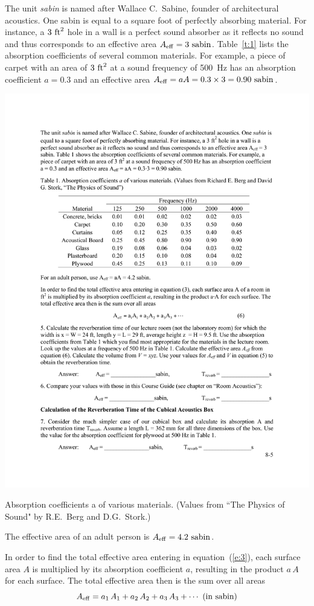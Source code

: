\documentclass[11pt]{NSF}
\def\be{\begin{equation}}
\def\ee{\end{equation}}
\begin{document}
The unit {\em sabin} is named after Wallace C.~Sabine, founder of
architectural acoustics. One sabin is equal to a square foot of
perfectly absorbing material. For instance, a $3~{\rm ft}^2$ 
hole in a wall is a perfect sound absorber as it reflects no sound 
and thus corresponds to an effective area 
$A_{\rm eff} = 3~{\rm sabin}$. 
Table~\ref{t:1} lists the absorption
coefficients of several common materials. For example, a piece of
carpet with an area of $3~{\rm ft}^2$ at a sound frequency of 
500~Hz has an absorption coefficient $a = 0.3$ and an effective 
area $A_{\rm eff} = a A = 0.3\times 3= 0.90~{\rm sabin}$.
%
\begin{table}[hbtp]
\begin{center}
\includegraphics[width=.8\textwidth]{tab8_1}
\caption{Absorption coefficients a of various materials. 
(Values from ``The Physics of Sound" by R.E.~Berg and D.G.~Stork.)}
\label{t:1}
\end{center}
\end{table}
%
The effective area of an adult person is $A_{\rm eff} = 4.2~{\rm sabin}$.

In order to find the total effective area entering in
equation~(\ref{e:3}), each surface area $A$ is multiplied by 
its absorption coefficient $a$, resulting in the
product $a\, A$ for each surface. 
The total effective area then is the sum over all areas
%
\be
A_{\rm eff} = a_1\,A_1 + a_2\,A_2 + a_3\,A_3 + \cdots
~(\textrm{in sabin})
\label{e:Aeff}
\ee
\end{document}
